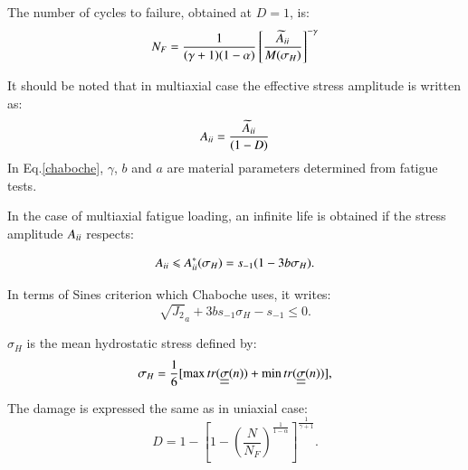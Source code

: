 \documentclass[3p,times,procedia,number]{elsarticle}
\begin{document}
The number of cycles to failure, obtained at $D=1$, is: 
\begin{equation}N_F = \frac{1}{(\gamma+1)(1-\alpha)}\left[\frac{\widetilde{A}_{\uppercase\expandafter{\romannumeral2}}}{M(\sigma_H)}\right]^{-\gamma}
\label{chaboche}
\end{equation} 

It should be noted that in multiaxial case the effective stress amplitude is written as:
$$A_{\uppercase\expandafter{\romannumeral2}}=\frac{\widetilde{A}_{\uppercase\expandafter{\romannumeral2}}}{(1-D)}$$
In Eq.\eqref{chaboche}, $\gamma$, $b$ and $a$ are material parameters determined from fatigue tests.

In the case of multiaxial fatigue loading, an infinite life is obtained if the stress amplitude $A_{\uppercase\expandafter{\romannumeral2}}$ respects:

\begin{equation}A_{\uppercase\expandafter{\romannumeral2}}\leqslant A_{\uppercase\expandafter{\romannumeral2}}^\ast(\sigma_H)=s_{-1}(1-3b\sigma_H).\end{equation}

In terms of Sines criterion which Chaboche uses, it writes:
\begin{equation}\sqrt{J_2}_a+3bs_{-1}\sigma_H-s_{-1}\leqslant 0.
\label{sines}
\end{equation}

$\sigma_H$ is the mean hydrostatic stress defined by:
\begin{equation}\sigma_H=\frac{1}{6}[\max tr(\uline{\uline{\sigma}}(n))+\min tr(\uline{\uline{\sigma}}(n))],\end{equation}


The damage is expressed the same as in uniaxial case:
\begin{equation}D=1-\left[ 1-\left( \frac{N}{N_F}\right) ^{\frac{1}{1-\alpha}}\right] ^{\frac{1}{\gamma+1}}.
\label{damage}
\end{equation}
\end{document}
